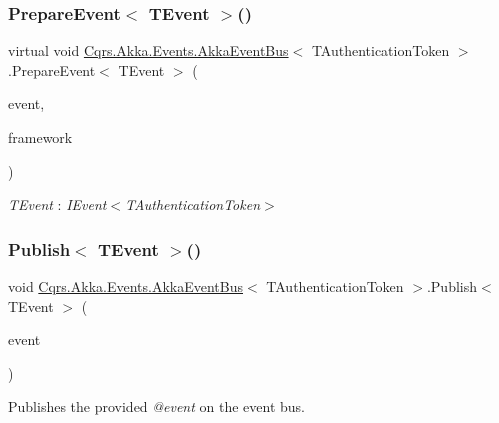 \subsubsection{\texorpdfstring{Prepare\+Event$<$ T\+Event $>$()}{PrepareEvent< TEvent >()}}
{\footnotesize\ttfamily virtual void \hyperlink{classCqrs_1_1Akka_1_1Events_1_1AkkaEventBus}{Cqrs.\+Akka.\+Events.\+Akka\+Event\+Bus}$<$ T\+Authentication\+Token $>$.Prepare\+Event$<$ T\+Event $>$ (\begin{DoxyParamCaption}\item[{T\+Event @}]{event,  }\item[{string}]{framework }\end{DoxyParamCaption})\hspace{0.3cm}{\ttfamily [virtual]}}

\begin{Desc}
\item[Type Constraints]\begin{description}
\item[{\em T\+Event} : {\em I\+Event$<$T\+Authentication\+Token$>$}]\end{description}
\end{Desc}
\mbox{\label{classCqrs_1_1Akka_1_1Events_1_1AkkaEventBus_aaba5d37020e21d03cc2bbc3da14f45ea_aaba5d37020e21d03cc2bbc3da14f45ea}} 
\subsubsection{\texorpdfstring{Publish$<$ T\+Event $>$()}{Publish< TEvent >()}\hspace{0.1cm}{\footnotesize\ttfamily [1/2]}}
{\footnotesize\ttfamily void \hyperlink{classCqrs_1_1Akka_1_1Events_1_1AkkaEventBus}{Cqrs.\+Akka.\+Events.\+Akka\+Event\+Bus}$<$ T\+Authentication\+Token $>$.Publish$<$ T\+Event $>$ (\begin{DoxyParamCaption}\item[{T\+Event @}]{event }\end{DoxyParamCaption})}



Publishes the provided {\itshape @event}  on the event bus. 



